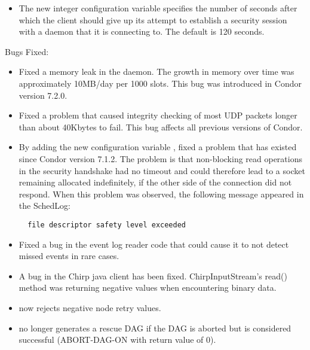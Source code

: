 \begin{itemize}

\item The new integer configuration variable
   specifies the
  number of seconds after which the client should give up its attempt to
  establish a security session with a daemon that it is connecting to.
  The default is 120 seconds.

\end{itemize}

\noindent Bugs Fixed:

\begin{itemize}

\item Fixed a memory leak in the  daemon.
  The growth in memory over time was approximately 10MB/day per 1000 slots.
  This bug was introduced in Condor version 7.2.0.

\item Fixed a problem that caused integrity checking of most UDP packets
longer than about 40Kbytes to fail.  This bug affects all previous versions of
Condor.

\item By adding the new configuration variable
  , fixed a problem
  that has existed since Condor version 7.1.2. 
  The problem is that non-blocking read
  operations in the security handshake had no timeout and could therefore
  lead to a socket remaining allocated indefinitely, if the other side of
  the connection did not respond.
  When this problem was observed,
  the following message appeared in the SchedLog:

\begin{verbatim}
  file descriptor safety level exceeded
\end{verbatim}

\item Fixed a bug in the event log reader code that could cause it to
  not detect missed events in rare cases.

\item A bug in the Chirp java client has been fixed.  ChirpInputStream's
read() method was returning negative values when encountering binary data.

\item {} now rejects negative node retry values.

\item {} no longer generates a rescue DAG if the DAG is
aborted but is considered successful (ABORT-DAG-ON with return value
of 0).

\end{itemize}

